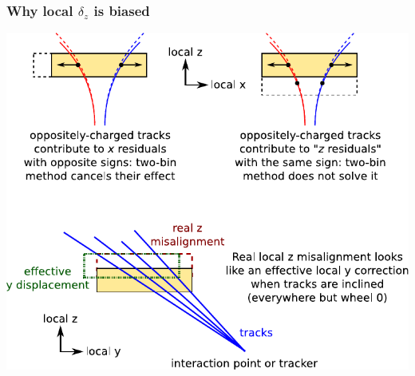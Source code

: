 \documentclass[compress]{beamer}
\begin{document}
\begin{frame}
\frametitle{Why local $\delta_z$ is biased}

\begin{center}
\includegraphics[width=0.9\linewidth]{explanation_of_z.pdf}
\end{center}
\end{frame}
\end{document}
